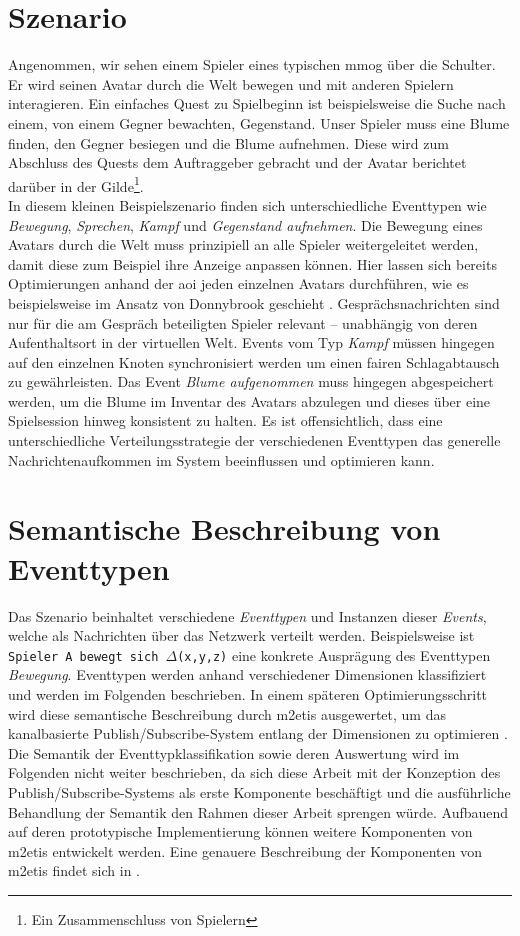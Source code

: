 \section{Szenario}
\label{chap:grundlagen:szenario}
Angenommen, wir sehen einem Spieler eines typischen \ac{mmog} über die Schulter. Er wird seinen Avatar durch die Welt bewegen und mit anderen Spielern interagieren. Ein einfaches Quest zu Spielbeginn ist beispielsweise die Suche nach einem, von einem Gegner bewachten, Gegenstand. Unser Spieler muss eine Blume finden, den Gegner besiegen und die Blume aufnehmen. Diese wird zum Abschluss des Quests dem Auftraggeber gebracht und der Avatar berichtet darüber in der Gilde\footnote{Ein Zusammenschluss von Spielern}.\\
In diesem kleinen Beispielszenario finden sich unterschiedliche Eventtypen wie \emph{Bewegung}, \emph{Sprechen}, \emph{Kampf} und \emph{Gegenstand aufnehmen}. Die Bewegung eines Avatars durch die Welt muss prinzipiell an alle Spieler weitergeleitet werden, damit diese zum Beispiel ihre Anzeige anpassen können. Hier lassen sich bereits Optimierungen anhand der \ac{aoi} jeden einzelnen Avatars durchführen, wie es beispielsweise im Ansatz von Donnybrook geschieht \cite{Bharambe2008Donnybrook}. Gesprächsnachrichten sind nur für die am Gespräch beteiligten Spieler relevant -- unabhängig von deren Aufenthaltsort in der virtuellen Welt. Events vom Typ \emph{Kampf} müssen hingegen auf den einzelnen Knoten synchronisiert werden um einen fairen Schlagabtausch zu gewährleisten. Das Event \emph{Blume aufgenommen} muss hingegen abgespeichert werden, um die Blume im Inventar des Avatars abzulegen und dieses über eine Spielsession hinweg konsistent zu halten. Es ist offensichtlich, dass eine unterschiedliche Verteilungsstrategie der verschiedenen Eventtypen das generelle Nachrichtenaufkommen im System beeinflussen und optimieren kann.

\section{Semantische Beschreibung von Eventtypen}
\label{chap:grundlagen:event}
Das Szenario beinhaltet verschiedene \emph{Eventtypen} und Instanzen dieser \emph{Events}, welche als Nachrichten über das Netzwerk verteilt werden. Beispielsweise ist \texttt{Spieler A bewegt sich $\Delta$(x,y,z)} eine konkrete Ausprägung des Eventtypen \emph{Bewegung}. Eventtypen werden anhand verschiedener Dimensionen klassifiziert und werden im Folgenden beschrieben. In einem späteren Optimierungsschritt wird diese semantische Beschreibung durch \ac{m2etis} ausgewertet, um das kanalbasierte Publish/Subscribe-System entlang der Dimensionen zu optimieren \cite{Fischer2010a}. Die Semantik der Event\-typ\-klassifi\-kation sowie deren Auswertung wird im Folgenden nicht weiter beschrieben, da sich diese Arbeit mit der Konzeption des Publish/Subscribe-Systems als erste Komponente beschäftigt und die ausführliche Behandlung der Semantik den Rahmen dieser Arbeit sprengen würde. Aufbauend auf deren prototypische Implementierung können weitere Komponenten von \ac{m2etis} entwickelt werden. Eine genauere Beschreibung der Komponenten von \ac{m2etis} findet sich in .

